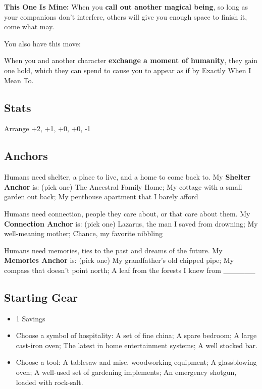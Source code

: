 \documentclass[
  oneside,
  statementpaper,
  9pt]{memoir}
\begin{document}
\textbf{This One Is Mine:} When you \textbf{call out another magical
being}, so long as your companions don't interfere, others will give you
enough space to finish it, come what may.

You also have this move:

When you and another character \textbf{exchange a moment of humanity},
they gain one hold, which they can spend to cause you to appear as if by
Exactly When I Mean To.

\hypertarget{stats-2}{%
\subsection{Stats}\label{stats-2}}

Arrange +2, +1, +0, +0, -1

\hypertarget{anchors-1}{%
\subsection{Anchors}\label{anchors-1}}

Humans need shelter, a place to live, and a home to come back to. My
\textbf{Shelter Anchor} is: (pick one) The Ancestral Family Home; My
cottage with a small garden out back; My penthouse apartment that I
barely afford

Humans need connection, people they care about, or that care about them.
My \textbf{Connection Anchor} is: (pick one) Lazarus, the man I saved
from drowning; My well-meaning mother; Chance, my favorite nibbling

Humans need memories, ties to the past and dreams of the future. My
\textbf{Memories Anchor} is: (pick one) My grandfather's old chipped
pipe; My compass that doesn't point north; A leaf from the forests I
knew from \_\_\_\_\_\_

\hypertarget{starting-gear-1}{%
\subsection{Starting Gear}\label{starting-gear-1}}

\begin{itemize}
\tightlist
\item
  1 Savings
\item
  Choose a symbol of hospitality: A set of fine china; A spare bedroom;
  A large cast-iron oven; The latest in home entertainment systems; A
  well stocked bar.
\item
  Choose a tool: A tablesaw and misc. woodworking equipment; A
  glassblowing oven; A well-used set of gardening implements; An
  emergency shotgun, loaded with rock-salt.
\end{itemize}
\end{document}

